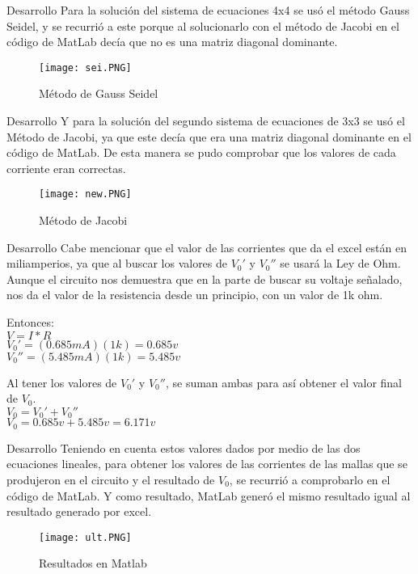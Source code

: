 \documentclass[11pt]{beamer}
\begin{document}
    
      \begin{frame}{Desarrollo}
    Para la solución del sistema de ecuaciones 4x4 se usó el método Gauss Seidel, y se recurrió a este porque al solucionarlo con el método de Jacobi en el código de MatLab decía que no es una matriz diagonal dominante.
\begin{figure}[hbtp]
\caption{Método de Gauss Seidel}
\centering
\texttt{[image: sei.PNG]}
\end{figure}
      \end{frame}
      
      
     
      \begin{frame}{Desarrollo}
    Y para la solución del segundo sistema de ecuaciones de 3x3 se usó el Método de Jacobi, ya que este decía que era una matriz diagonal dominante en el código de MatLab. De esta manera se pudo comprobar que los valores de cada corriente eran correctas.
\begin{figure}[hbtp]
\caption{Método de Jacobi}
\centering
\texttt{[image: new.PNG]}
\end{figure}
      \end{frame}
      
      
      \begin{frame}{Desarrollo}
   \justifying
      Cabe mencionar que el valor de las corrientes que da el excel están en miliamperios, ya que al buscar los valores de $V_0'$ y $V_0''$ se usará la Ley de Ohm.
Aunque el circuito nos demuestra que en la parte de buscar su voltaje señalado, nos da el valor de la resistencia desde un principio, con un valor de 1k ohm.

Entonces:\\
$V=I*R$\\
$V_0'=(0.685mA)(1k)=0.685v$\\
$V_0''=(5.485mA)(1k)=5.485v$

Al tener los valores de $V_0'$ y $V_0''$, se suman ambas para así obtener el valor final de $V_0$.\\
$V_0 = V_0' + V_0''$\\
$V_0 = 0.685v + 5.485v = 6.171v$
      \end{frame}
      
       
      \begin{frame}{Desarrollo}
   \justifying
      Teniendo en cuenta estos valores dados por medio de las dos ecuaciones lineales, para obtener los valores de las corrientes de las mallas que se produjeron en el circuito y el resultado de $V_0$, se recurrió a comprobarlo en el código de MatLab.
Y como resultado, MatLab generó el mismo resultado igual al resultado generado por excel.
\begin{figure}[hbtp]
\caption{Resultados en Matlab}
\centering
\texttt{[image: ult.PNG]}
\end{figure}
      \end{frame}
               
\end{document}
